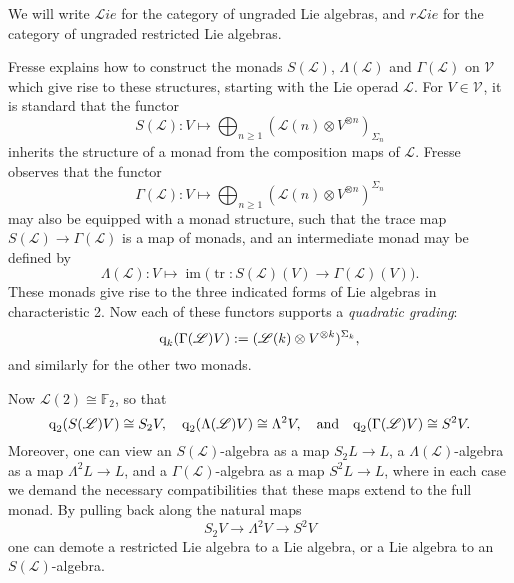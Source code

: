 \documentclass[11pt]{amsart}
\theoremstyle{plain}
\theoremstyle{definition}
\DeclareMathOperator{\im}{im}
\DeclareMathOperator{\trace}{tr}
\renewcommand{\to}{\longrightarrow}
\newcommand{\scrL}{\mathscr{L}}
\newcommand{\calV}{\mathcal{V}}
\theoremstyle{plain}
\newcommand{\LieOperad}{{\scrL}}
\newcommand{\vect}[2]{\calV^{#1}_{#2}}
\newcommand{\quadgrad}[1]{\textup{q}_{#1}}
\newcommand{\F}{\mathbb{F}}
\newcommand{\liealgs}{{\scrL\!\textit{ie}}}
\newcommand{\restliealgs}{{\textit{r}\scrL\!\textit{ie}}}
\newcommand{\Ftwo}{\F_2}
\begin{document}
\begin{Conventions and notation}
We will  write $\liealgs$ for the category of ungraded Lie algebras, and $\restliealgs$ for the category of ungraded restricted Lie algebras.

Fresse \cite{FresseSimplicialAlgs.pdf} explains how to construct the monads $S(\LieOperad)$, $\Lambda(\LieOperad)$ and $\Gamma(\LieOperad)$ on $\vect{}{}$ which give rise to these structures, starting with the Lie operad $\LieOperad$. For $V\in\vect{}{}$, it is standard that the functor
\[S(\LieOperad):V\mapsto \bigoplus_{n\geq1}(\LieOperad(n)\otimes V^{\otimes n})_{\Sigma_n}\]
inherits the structure of a monad from the composition maps of $\LieOperad$. Fresse observes that the functor
\[\Gamma(\LieOperad):V\mapsto \bigoplus_{n\geq1}(\LieOperad(n)\otimes V^{\otimes n})^{\Sigma_n}\]
may also be equipped with a monad structure, such that the trace map $S(\LieOperad)\to \Gamma(\LieOperad)$
is a map of monads, and an intermediate monad may be defined by
\[\Lambda(\LieOperad):V\mapsto\im\bigl(\trace:S(\LieOperad)(V)\to \Gamma(\LieOperad)(V)\bigr).\]
These monads give rise to the three indicated forms of Lie algebras in characteristic 2. Now each of these functors supports a \emph{quadratic grading}:
\[\quadgrad{k}(\Gamma(\LieOperad)V):=(\LieOperad(k)\otimes V^{\otimes k})^{\Sigma_k},\]
and similarly for the other two monads.

 Now $\LieOperad(2)\cong\Ftwo $, so that
\[\quadgrad{2}(S(\LieOperad)V)\cong S_2V,\quad \quadgrad{2}(\Lambda(\LieOperad)V)\cong \Lambda^2V,\quad\textup{and}\quad\quadgrad{2}(\Gamma(\LieOperad)V)\cong S^2V.\]
Moreover, one can view an $S(\LieOperad)$-algebra as a map $S_2L\to L$, a $\Lambda(\LieOperad)$-algebra as a map $\Lambda^2L\to L$, and a $\Gamma(\LieOperad)$-algebra as a map $S^2L\to L$, where in each case we demand the necessary compatibilities that these maps extend to the full monad. %
By pulling back along the natural maps
\[S_2V\to \Lambda^2 V\to S^2V\]
one can demote a restricted Lie algebra to a Lie algebra, or a Lie algebra to an $S(\LieOperad)$-algebra.


\end{Conventions and notation}
\end{document}
